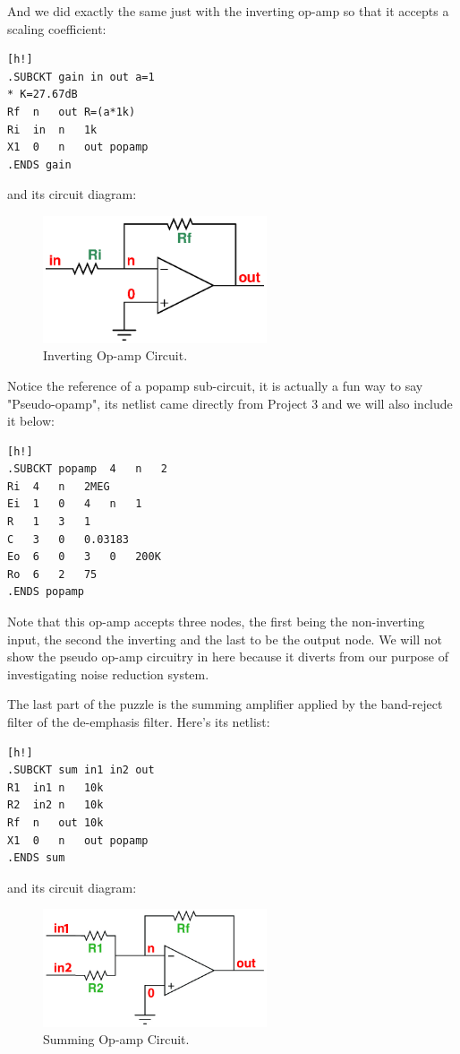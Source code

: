 \documentclass[a4paper]{IEEEtran}
\begin{document}
		And we did exactly the same just with the inverting op-amp so that it accepts a scaling coefficient:
		\begin{center}
		\begin{lstlisting}[caption=Inverting Op-Amp netlist.][h!]
.SUBCKT	gain in out a=1
* K=27.67dB
Rf	n	out	R=(a*1k)
Ri	in	n	1k
X1	0	n	out	popamp
.ENDS gain
		\end{lstlisting}
		\end{center}
		and its circuit diagram:
		\begin{figure}[h!]
			\label{gain.cir}
			\includegraphics[width=250px]{gain.eps}
			\caption{Inverting Op-amp Circuit.}
		\end{figure}
		
		Notice the reference of a popamp sub-circuit, it is actually a fun way to say "Pseudo-opamp", its netlist came directly from Project 3 and we will also include it below:
		\begin{center}
		\begin{lstlisting}[caption=RC Pseudo-op-amp netlist.][h!]
.SUBCKT popamp 	4 	n 	2
Ri	4	n	2MEG
Ei	1	0	4	n	1
R	1	3	1
C	3	0	0.03183
Eo	6	0	3	0	200K
Ro	6	2	75
.ENDS popamp
		\end{lstlisting}
		\end{center}
		Note that this op-amp accepts three nodes, the first being the non-inverting input, the second the inverting and the last to be the output node. We will not show the pseudo op-amp circuitry in here because it diverts from our purpose of investigating noise reduction system.
		
		The last part of the puzzle is the summing amplifier applied by the band-reject filter of the de-emphasis filter. Here's its netlist:
		\begin{center}
		\begin{lstlisting}[caption=Summing Op-Amp netlist.][h!]
.SUBCKT sum in1 in2 out
R1	in1	n	10k
R2	in2	n	10k
Rf	n	out	10k
X1	0	n	out	popamp
.ENDS sum 
		\end{lstlisting}
		\end{center}
		and its circuit diagram:
		\begin{figure}[h!]
			\label{sum.cir}
			\includegraphics[width=250px]{sum.jpg}
			\caption{Summing Op-amp Circuit.}
		\end{figure}
\end{document}

